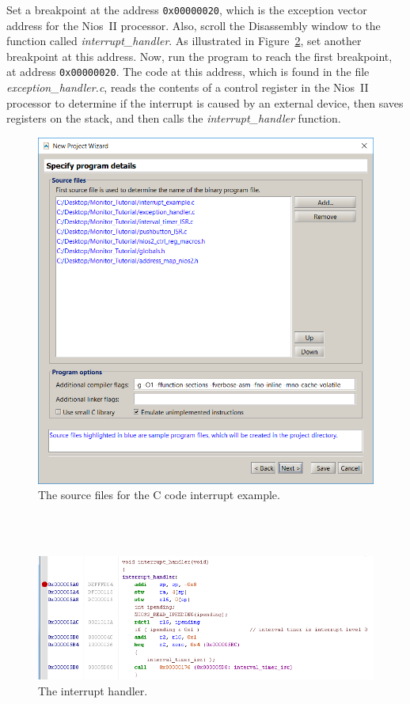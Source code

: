 \documentclass[11pt, twoside, pdftex]{article}
\begin{document}
Set a breakpoint at the address \texttt{0x00000020}, which is the
exception vector address for the Nios~II processor.  Also, scroll
the Disassembly window to the function called 
{\it interrupt\_handler}. As illustrated in Figure~\ref{fig:35}, set
another breakpoint at this address. Now, run the program to reach
the first breakpoint, at address \texttt{0x00000020}. 
The code at this address, which is found in the file
{\it exception\_handler.c}, reads the contents of a control
register in the Nios~II processor to determine if the interrupt
is caused by an external device, then saves registers on the
stack, and then calls the {\it interrupt\_handler} function.

\newpage
\begin{figure}[H]
   \begin{center}
      \includegraphics[scale=0.5]{screenshots/figure34.png}
   \end{center}
   \caption{The source files for the C code interrupt example.} 
	 \label{fig:34}
\end{figure}

~\\
~\\
\begin{figure}[H]
   \begin{center}
      \includegraphics[scale=0.8]{screenshots/figure35.png}
   \end{center}
   \caption{The interrupt handler.} 
	 \label{fig:35}
\end{figure}
\end{document}
